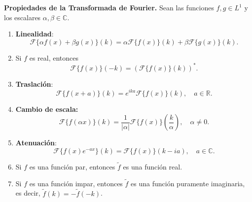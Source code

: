 \begin{propiedad} 
\textbf{Propiedades de la Transformada de Fourier.} Sean las funciones $f, g \in L^1$ y los escalares $\alpha, \beta \in \mathbb{C}$.

\begin{enumerate}
    \item \textbf{Linealidad}: $$\mathcal{F}\{\alpha f(x) + \beta g(x)\}(k) = \alpha \mathcal{F}\{f(x)\}(k) + \beta \mathcal{F}\{g(x)\}(k).$$ 
    
    \item Si $f$ es real, entonces 
    $$ \mathcal{F}\{f(x)\}(-k) = (\mathcal{F}\{f(x)\}(k))^*.$$
    
    \item \textbf{Traslación}: $$\mathcal{F}\{f(x+a)\}(k) = e^{ika} \mathcal{F}\{f(x)\}(k), \quad a \in \mathbb{R}.$$
    
    \item \textbf{Cambio de escala:} $$\mathcal{F}\{f(\alpha x)\}(k) = \frac{1}{|\alpha|}\mathcal{F}\{f(x)\}\left(\frac{k}{ \alpha}\right), \quad\alpha \neq 0.$$
    
    \item  \textbf{Atenuación}: $$\mathcal{F}\{f(x)e^{-ax}\}(k) =  \mathcal{F}\{f(x)\}(k-ia), \quad a \in \mathbb{C}.$$
    
    \item Si $f$ es una función par, entonces $\tilde{f}$ es una función real.
    
    \item Si $f$ es una función impar, entonces $\tilde{f}$ es una función puramente imaginaria, es decir, $\tilde{f}(k) = - \tilde{f}(-k)$.

\end{enumerate}
\end{propiedad}

